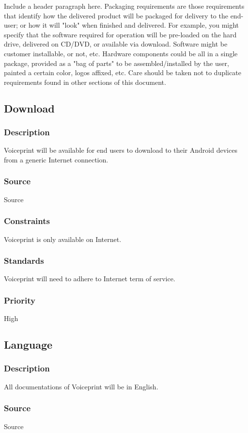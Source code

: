 Include a header paragraph here. Packaging requirements are those requirements that identify how the delivered product will be packaged for delivery to the end-user; or how it will "look" when finished and delivered. For example, you might specify that the software required for operation will be pre-loaded on the hard drive, delivered on CD/DVD, or available via download. Software might be customer installable, or not, etc. Hardware components could be all in a single package, provided as a "bag of parts" to be assembled/installed by the user, painted a certain color, logos affixed, etc. Care should be taken not to duplicate requirements found in other sections of this document.

\subsection{Download}
\subsubsection{Description}
Voiceprint will be available for end users to download to their Android devices from a generic Internet connection.
\subsubsection{Source}
Source
\subsubsection{Constraints}
Voiceprint is only available on Internet.
\subsubsection{Standards}
Voiceprint will need to adhere to Internet term of service.
\subsubsection{Priority}
High

\subsection{Language}
\subsubsection{Description}
All documentations of Voiceprint will be in English.
\subsubsection{Source}
Source
